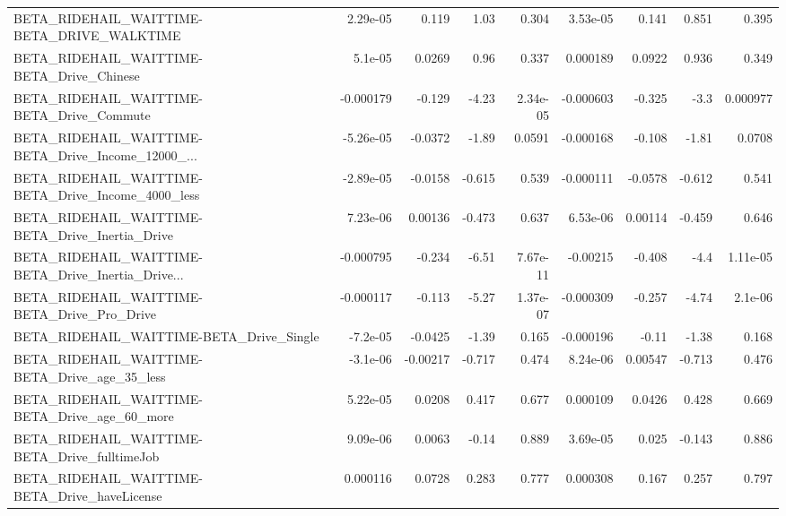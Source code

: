 \begin{tabular}{lrrrrrrrr}
BETA\_RIDEHAIL\_WAITTIME-BETA\_DRIVE\_WALKTIME         &    2.29e-05 &        0.119 &     1.03 &    0.304 &   3.53e-05 &       0.141 &        0.851 &         0.395 \\
BETA\_RIDEHAIL\_WAITTIME-BETA\_Drive\_Chinese          &     5.1e-05 &       0.0269 &     0.96 &    0.337 &   0.000189 &      0.0922 &        0.936 &         0.349 \\
BETA\_RIDEHAIL\_WAITTIME-BETA\_Drive\_Commute          &   -0.000179 &       -0.129 &    -4.23 & 2.34e-05 &  -0.000603 &      -0.325 &         -3.3 &      0.000977 \\
BETA\_RIDEHAIL\_WAITTIME-BETA\_Drive\_Income\_12000\_... &   -5.26e-05 &      -0.0372 &    -1.89 &   0.0591 &  -0.000168 &      -0.108 &        -1.81 &        0.0708 \\
BETA\_RIDEHAIL\_WAITTIME-BETA\_Drive\_Income\_4000\_less &   -2.89e-05 &      -0.0158 &   -0.615 &    0.539 &  -0.000111 &     -0.0578 &       -0.612 &         0.541 \\
BETA\_RIDEHAIL\_WAITTIME-BETA\_Drive\_Inertia\_Drive    &    7.23e-06 &      0.00136 &   -0.473 &    0.637 &   6.53e-06 &     0.00114 &       -0.459 &         0.646 \\
BETA\_RIDEHAIL\_WAITTIME-BETA\_Drive\_Inertia\_Drive... &   -0.000795 &       -0.234 &    -6.51 & 7.67e-11 &   -0.00215 &      -0.408 &         -4.4 &      1.11e-05 \\
BETA\_RIDEHAIL\_WAITTIME-BETA\_Drive\_Pro\_Drive        &   -0.000117 &       -0.113 &    -5.27 & 1.37e-07 &  -0.000309 &      -0.257 &        -4.74 &       2.1e-06 \\
BETA\_RIDEHAIL\_WAITTIME-BETA\_Drive\_Single           &    -7.2e-05 &      -0.0425 &    -1.39 &    0.165 &  -0.000196 &       -0.11 &        -1.38 &         0.168 \\
BETA\_RIDEHAIL\_WAITTIME-BETA\_Drive\_age\_35\_less      &    -3.1e-06 &     -0.00217 &   -0.717 &    0.474 &   8.24e-06 &     0.00547 &       -0.713 &         0.476 \\
BETA\_RIDEHAIL\_WAITTIME-BETA\_Drive\_age\_60\_more      &    5.22e-05 &       0.0208 &    0.417 &    0.677 &   0.000109 &      0.0426 &        0.428 &         0.669 \\
BETA\_RIDEHAIL\_WAITTIME-BETA\_Drive\_fulltimeJob      &    9.09e-06 &       0.0063 &    -0.14 &    0.889 &   3.69e-05 &       0.025 &       -0.143 &         0.886 \\
BETA\_RIDEHAIL\_WAITTIME-BETA\_Drive\_haveLicense      &    0.000116 &       0.0728 &    0.283 &    0.777 &   0.000308 &       0.167 &        0.257 &         0.797 \\

\end{tabular}
